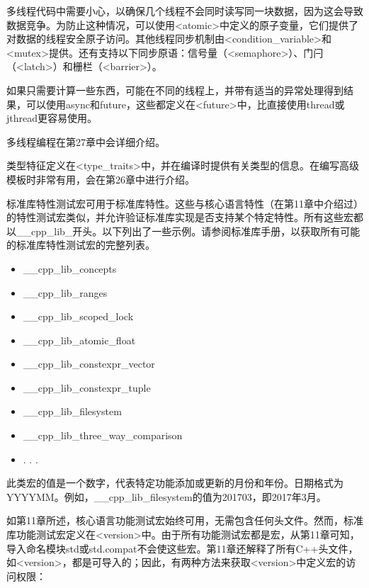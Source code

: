 多线程代码中需要小心，以确保几个线程不会同时读写同一块数据，因为这会导致数据竞争。为防止这种情况，可以使用<atomic>中定义的原子变量，它们提供了对数据的线程安全原子访问。其他线程同步机制由<condition\_variable>和<mutex>提供。还有支持以下同步原语：信号量（<semaphore>）、门闩（<latch>）和栅栏（<barrier>）。

如果只需要计算一些东西，可能在不同的线程上，并带有适当的异常处理得到结果，可以使用async和future，这些都定义在<future>中，比直接使用thread或jthread更容易使用。

多线程编程在第27章中会详细介绍。


类型特征定义在<type\_traits>中，并在编译时提供有关类型的信息。在编写高级模板时非常有用，会在第26章中进行介绍。


标准库特性测试宏可用于标准库特性。这些与核心语言特性（在第11章中介绍过）的特性测试宏类似，并允许验证标准库实现是否支持某个特定特性。所有这些宏都以\_\_cpp\_lib\_开头。以下列出了一些示例。请参阅标准库手册，以获取所有可能的标准库特性测试宏的完整列表。

\begin{itemize}
\item
\_\_cpp\_lib\_concepts

\item
\_\_cpp\_lib\_ranges

\item
\_\_cpp\_lib\_scoped\_lock

\item
\_\_cpp\_lib\_atomic\_float

\item
\_\_cpp\_lib\_constexpr\_vector

\item
\_\_cpp\_lib\_constexpr\_tuple

\item
\_\_cpp\_lib\_filesystem

\item
\_\_cpp\_lib\_three\_way\_comparison

\item
. . .
\end{itemize}

此类宏的值是一个数字，代表特定功能添加或更新的月份和年份。日期格式为YYYYMM。例如，\_\_cpp\_lib\_filesystem的值为201703，即2017年3月。

如第11章所述，核心语言功能测试宏始终可用，无需包含任何头文件。然而，标准库功能测试宏定义在<version>中。由于所有功能测试宏都是宏，从第11章可知，导入命名模块std或std.compat不会使这些宏。第11章还解释了所有C++头文件，如<version>，都是可导入的；因此，有两种方法来获取<version>中定义宏的访问权限：

